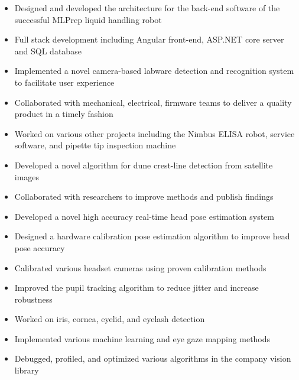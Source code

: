 \documentclass[10pt,a4paper,ragged2e,withhyper]{altacv}
\begin{document}
	\begin{paracol}{2}
		
		
		\begin{itemize}
			\item Designed and developed the architecture for the back-end software of the successful MLPrep liquid handling robot
			\item Full stack development including Angular front-end, ASP.NET core server and SQL database
			\item Implemented a novel camera-based labware detection and recognition system to facilitate user experience
			\item Collaborated with mechanical, electrical, firmware teams to deliver a quality product in a timely fashion
			\item Worked on various other projects including the Nimbus ELISA robot, service software, and pipette tip inspection machine
		\end{itemize}
		
		\divider
		
		\begin{itemize}
			\item Developed a novel algorithm for dune crest-line detection from satellite images
			\item Collaborated with researchers to improve methods and publish findings
		\end{itemize}
		
		\divider
		
		\begin{itemize}
			\item Developed a novel high accuracy real-time head pose estimation system
			\item Designed a hardware calibration pose estimation algorithm to improve head pose accuracy
			\item Calibrated various headset cameras using proven calibration methods
			\item Improved the pupil tracking algorithm to reduce jitter and increase robustness
			\item Worked on iris, cornea, eyelid, and eyelash detection
			\item Implemented various machine learning and eye gaze mapping methods
			\item Debugged, profiled, and optimized various algorithms in the company vision library
		\end{itemize}
		

\end{paracol}
\end{document}
